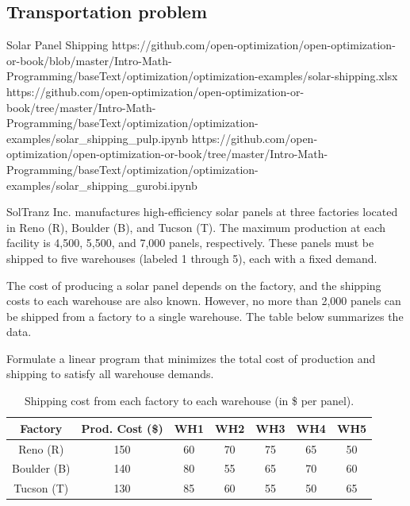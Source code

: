 %
%




\subsection{Transportation problem}
\begin{examplewithallcode}{Solar Panel Shipping}
{https://github.com/open-optimization/open-optimization-or-book/blob/master/Intro-Math-Programming/baseText/optimization/optimization-examples/solar-shipping.xlsx}
{https://github.com/open-optimization/open-optimization-or-book/tree/master/Intro-Math-Programming/baseText/optimization/optimization-examples/solar_shipping_pulp.ipynb}
{https://github.com/open-optimization/open-optimization-or-book/tree/master/Intro-Math-Programming/baseText/optimization/optimization-examples/solar_shipping_gurobi.ipynb}

SolTranz Inc. manufactures high-efficiency solar panels at three factories located in Reno (R), Boulder (B), and Tucson (T). The maximum production at each facility is 4,500, 5,500, and 7,000 panels, respectively. These panels must be shipped to five warehouses (labeled 1 through 5), each with a fixed demand.

The cost of producing a solar panel depends on the factory, and the shipping costs to each warehouse are also known. However, no more than 2,000 panels can be shipped from a factory to a single warehouse. The table below summarizes the data.

Formulate a linear program that minimizes the total cost of production and shipping to satisfy all warehouse demands.

\end{examplewithallcode}

\begin{table}[h!] \begin{center} \begin{tabular} {|c|c|c|c|c|c|c|}
\hline Factory  & Prod. Cost (\$) & WH1 & WH2 & WH3 & WH4 & WH5 \\ \hline
\hline Reno (R)     & 150     & 60  & 70  & 75  & 65  & 50 \\
\hline Boulder (B)  & 140     & 80  & 55  & 65  & 70  & 60 \\
\hline Tucson (T)   & 130     & 85  & 60  & 55  & 50  & 65 \\
\hline
\end{tabular} \end{center} \caption*{Shipping cost from each factory to each warehouse (in \$ per panel).}
\end{table}

